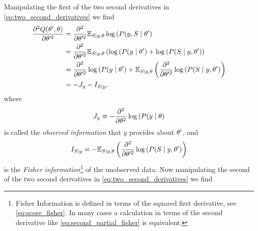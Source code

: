 Manipulating the first of the two second derivatives in
\eqref{eq:two_second_derivatives} we find
\begin{align}
  \nonumber
  \frac{\partial^2 Q(\theta',  \theta)}{\partial \theta'^2}
  &= \frac{\partial^2}{\partial \theta'^2} \mathbb{E}_{S \mid y, \theta}
    \log \left( P(y, S \mid \theta' \right) \\
  \nonumber
  &= \frac{\partial^2}{\partial \theta'^2} \mathbb{E}_{S \mid y, \theta}
    \left( \log \left( P(y \mid \theta' \right) + \log \left( P(S
    \mid y, \theta' \right) \right)\\
  \nonumber
  &=  \frac{\partial^2}{\partial \theta'^2} \log \left( P(y \mid
    \theta' \right) + \mathbb{E}_{S \mid y, \theta} \left(
    \frac{\partial^2}{\partial \theta'^2} \log \left( P(S \mid y,
    \theta' \right) \right) \\
  \label{eq:second_partial_information}
  &= -J_y - I_{S \mid y},
\end{align}
where
\begin{equation*}
  J_y\equiv-\frac{\partial^2}{\partial \theta^2} \log \left( P(y \mid
  \theta \right)
\end{equation*}
is called the \emph{observed information} that $y$ provides about
$\theta'$, and
\begin{equation}
  \label{eq:second_partial_fisher}
  I_{S \mid y} = -\mathbb{E}_{S \mid y, \theta} \left(
    \frac{\partial^2}{\partial \theta'^2} \log \left( P(S \mid y,
    \theta' \right) \right)
\end{equation}
is the \emph{Fisher information}\footnote{Fisher Information is
  defined in terms of the squared first derivative, see
  \eqref{eq:score_fisher}.  In many cases a calculation in terms of
  the second derivative like \eqref{eq:second_partial_fisher} is
  equivalent.}  of the
  unobserved data.  Now manipulating the second of the two second
  derivatives in \eqref{eq:two_second_derivatives} we find
